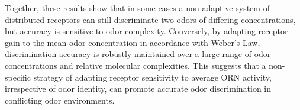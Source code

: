 Together, these results show that in some cases a non-adaptive system of distributed receptors can still discriminate two odors of differing concentrations, but accuracy is sensitive to odor complexity. Conversely, by adapting receptor gain to the mean odor concentration in accordance with Weber's Law, discrimination accuracy is robustly maintained over a large range of odor concentrations and relative molecular complexities. This suggests that a non-specific strategy of adapting receptor sensitivity to average ORN activity, irrespective of odor identity, can promote accurate odor discrimination in conflicting odor environments.





